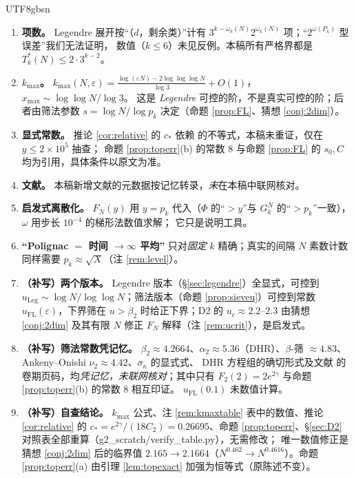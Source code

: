\documentclass[11pt,a4paper]{article}
\newcommand{\Tmix}{T^{*}}               %
\newcommand{\kmax}{k_{\max}}
\theoremstyle{plain}
\theoremstyle{definition}
\begin{document}
\begin{CJK}{UTF8}{gbsn}
\begin{enumerate}[leftmargin=*]
\item \textbf{项数。} Legendre 展开按“（$d$，剩余类）”计有 $3^{k-\omega_k(N)}2^{\omega_k(N)}$ 项；“$2^{\omega(P_k)}$ 型误差”我们无法证明，
数值（$k\le6$）未见反例。本稿所有严格界都是 $\Tmix_k(N)\le2\cdot3^{k-2}$。
\item \textbf{$\kmax$。} $\kmax(N,\varepsilon)=\frac{\log(\varepsilon N)-2\log\log\log N}{\log3}+O(1)$，$x_{\max}\sim\log\log N/\log3$。
这是 \emph{Legendre} 可控的阶，不是真实可控的阶；后者由筛法参数 $s=\log N/\log p_k$ 决定（命题 \ref{prop:FL}、猜想 \ref{conj:2dim}）。
\item \textbf{显式常数。} 推论 \ref{cor:relative} 的 $c_*$ 依赖 \cite{RS62} 的不等式，本稿未重证，仅在 $y\le2\times10^5$ 抽查；
命题 \ref{prop:toperr}(b) 的常数 $8$ 与命题 \ref{prop:FL} 的 $s_0,C$ 均为引用，具体条件以原文为准。
\item \textbf{文献。} 本稿新增文献的元数据按记忆转录，\emph{未}在本稿中联网核对。
\item \textbf{启发式离散化。} $F_N(y)$ 用 $y=p_k$ 代入（$\Phi$ 的“$>y$”与 $G_k^N$ 的“$>p_k$”一致），$\omega$ 用步长 $10^{-4}$ 的梯形法数值求解；
它只是说明工具。
\item \textbf{“Polignac $=$ 时间 $\to\infty$ 平均”} 只对\emph{固定} $k$ 精确；真实的间隔 $N$ 素数计数同样需要 $p_k\approx\sqrt X$（注 \ref{rem:level}）。
\item \textbf{（补写）两个版本。} Legendre 版本（\S\ref{sec:legendre}）全显式，可控到 $u_{\mathrm{Leg}}\sim\log N/\log\log N$；筛法版本（命题 \ref{prop:sieveu}）可控到常数
$u_{\mathrm{FL}}(\varepsilon)$，下界筛在 $u>\beta_2$ 时给正下界；D2 的 $u_c\approx2.2$--$2.3$ 由猜想 \ref{conj:2dim} 及其有限 $N$ 修正 $F_N$ 解释（注 \ref{rem:ucrit}），是启发式。
\item \textbf{（补写）筛法常数凭记忆。} $\beta_2\approx4.2664$、$\alpha_2\approx5.36$（DHR）、$\beta$-筛 $\approx4.83$、Ankeny--Onishi $\nu_2\approx4.42$、$\sigma_\kappa$ 的显式式、
DHR 方程组的确切形式及文献 \cite{DHR88,DH08,Iwa80,AO65} 的卷期页码，均\emph{凭记忆，未联网核对}；其中只有 $F_2(2)=2e^{2\gamma}$ 与命题 \ref{prop:toperr}(b) 的常数 $8$ 相互印证。
$u_{\mathrm{FL}}(0.1)$ 未数值计算。
\item \textbf{（补写）自查结论。} $\kmax$ 公式、注 \ref{rem:kmaxtable} 表中的数值、推论 \ref{cor:relative} 的 $c_*=e^{2\gamma}/(18C_2)=0.26695$、命题 \ref{prop:toperr}、\S\ref{sec:D2} 对照表全部重算（g2\_scratch/verify\_table.py），无需修改；
唯一数值修正是猜想 \ref{conj:2dim} 后的临界值 $2.165\to2.1664$（$N^{0.462}\to N^{0.4616}$）。命题 \ref{prop:toperr}(a) 由引理 \ref{lem:topexact} 加强为恒等式（原陈述不变）。
\end{enumerate}


\end{CJK}
\end{document}
